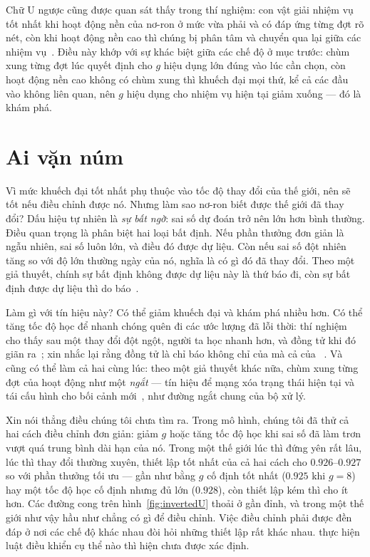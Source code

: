 Chữ U ngược cũng được quan sát thấy trong thí nghiệm: con vật giải nhiệm vụ tốt nhất khi hoạt động nền của nơ-ron  ở mức vừa phải và có đáp ứng từng đợt rõ nét, còn khi hoạt động nền cao thì chúng bị phân tâm và chuyển qua lại giữa các nhiệm vụ~\cite{AstonJones2005}. Điều này khớp với sự khác biệt giữa các chế độ ở mục trước: chùm xung từng đợt lúc quyết định cho $g$ hiệu dụng lớn đúng vào lúc cần chọn, còn hoạt động nền cao không có chùm xung thì khuếch đại mọi thứ, kể cả các đầu vào không liên quan, nên $g$ hiệu dụng cho nhiệm vụ hiện tại giảm xuống --- đó là khám phá.

\section{Ai vặn núm}

Vì mức khuếch đại tốt nhất phụ thuộc vào tốc độ thay đổi của thế giới, nên sẽ tốt nếu điều chỉnh được nó. Nhưng làm sao nơ-ron  biết được thế giới đã thay đổi? Dấu hiệu tự nhiên là \emph{sự bất ngờ}: sai số dự đoán trở nên lớn hơn bình thường. Điều quan trọng là phân biệt hai loại bất định. Nếu phần thưởng đơn giản là ngẫu nhiên, sai số luôn lớn, và điều đó được dự liệu. Còn nếu sai số đột nhiên tăng so với độ lớn thường ngày của nó, nghĩa là có gì đó đã thay đổi. Theo một giả thuyết, chính sự bất định không được dự liệu này là thứ  báo đi, còn sự bất định được dự liệu thì do  báo~\cite{YuDayan2005}.

Làm gì với tín hiệu này? Có thể giảm khuếch đại và khám phá nhiều hơn. Có thể tăng tốc độ học để nhanh chóng quên đi các ước lượng đã lỗi thời: thí nghiệm cho thấy sau một thay đổi đột ngột, người ta học nhanh hơn, và đồng tử khi đó giãn ra~\cite{Nassar2012}; xin nhắc lại rằng đồng tử là chỉ báo không chỉ của  mà cả của ~\cite{Reimer2016}. Và cũng có thể làm cả hai cùng lúc: theo một giả thuyết khác nữa, chùm xung từng đợt của  hoạt động như một \emph{ngắt} --- tín hiệu để mạng xóa trạng thái hiện tại và tái cấu hình cho bối cảnh mới~\cite{BouretSara2005}, như đường ngắt chung của bộ xử lý.

Xin nói thẳng điều chúng tôi chưa tìm ra. Trong mô hình, chúng tôi đã thử cả hai cách điều chỉnh đơn giản: giảm $g$ hoặc tăng tốc độ học khi sai số đã làm trơn vượt quá trung bình dài hạn của nó. Trong một thế giới lúc thì đứng yên rất lâu, lúc thì thay đổi thường xuyên, thiết lập tốt nhất của cả hai cách cho $0.926$--$0.927$ so với phần thưởng tối ưu --- gần như bằng $g$ cố định tốt nhất ($0.925$ khi $g=8$) hay một tốc độ học cố định nhưng đủ lớn ($0.928$), còn thiết lập kém thì cho ít hơn. Các đường cong trên hình~\ref{fig:invertedU} thoải ở gần đỉnh, và trong một thế giới như vậy hầu như chẳng có gì để điều chỉnh. Việc điều chỉnh phải được đền đáp ở nơi các chế độ khác nhau đòi hỏi những thiết lập rất khác nhau.  thực hiện luật điều khiển cụ thể nào thì hiện chưa được xác định.

